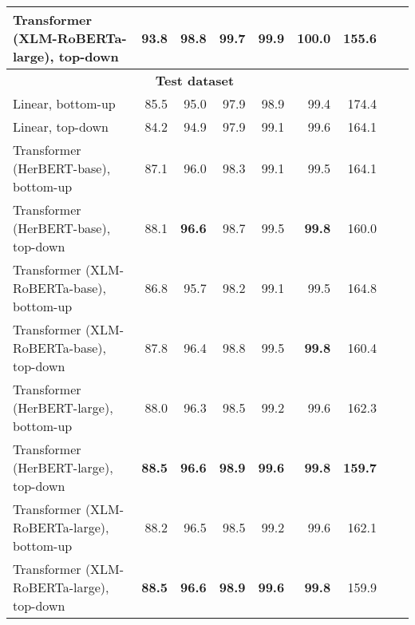 \begin{table}[ht!]
{\begin{tabular}{lrrrrrrrr}
  Transformer (XLM-RoBERTa-large), top-down & 93.8 & 98.8 & 99.7 & \textbf{99.9} & 100.0 & 155.6 \\ 
   \hline \multicolumn{7}{c}{\textbf{Test dataset}} \\ \hline
Linear, bottom-up & 85.5 & 95.0 & 97.9 & 98.9 & 99.4 & 174.4 \\ 
  Linear, top-down & 84.2 & 94.9 & 97.9 & 99.1 & 99.6 & 164.1 \\ 
  Transformer (HerBERT-base), bottom-up & 87.1 & 96.0 & 98.3 & 99.1 & 99.5 & 164.1 \\ 
  Transformer (HerBERT-base), top-down & 88.1 & \textbf{96.6} & 98.7 & 99.5 & \textbf{99.8} & 160.0 \\ 
  Transformer (XLM-RoBERTa-base), bottom-up & 86.8 & 95.7 & 98.2 & 99.1 & 99.5 & 164.8 \\ 
  Transformer (XLM-RoBERTa-base), top-down & 87.8 & 96.4 & 98.8 & 99.5 & \textbf{99.8} & 160.4 \\ 
  Transformer (HerBERT-large), bottom-up & 88.0 & 96.3 & 98.5 & 99.2 & 99.6 & 162.3 \\ 
  Transformer (HerBERT-large), top-down & \textbf{88.5} & \textbf{96.6} & \textbf{98.9} & \textbf{99.6} & \textbf{99.8} & \textbf{159.7} \\ 
  Transformer (XLM-RoBERTa-large), bottom-up & 88.2 & 96.5 & 98.5 & 99.2 & 99.6 & 162.1 \\ 
  Transformer (XLM-RoBERTa-large), top-down & \textbf{88.5} & \textbf{96.6} & \textbf{98.9} & \textbf{99.6} & \textbf{99.8} & 159.9 \\ 
   \hline
\end{tabular}
}
\end{table}




